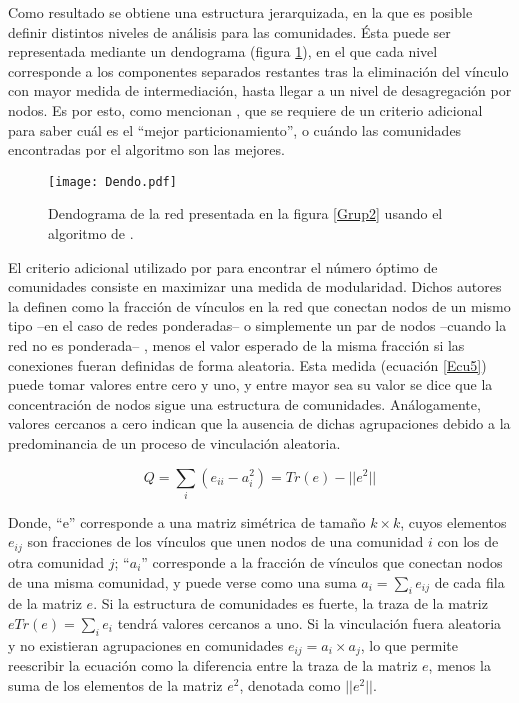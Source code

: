 \documentclass[12pt,letter]{article}
\begin{document}
\vspace{0.5cm}

Como resultado se obtiene una estructura jerarquizada, en la que es posible definir distintos niveles de análisis para las comunidades. Ésta puede ser representada mediante un dendograma (figura \ref{dendo}), en el que cada nivel corresponde a los componentes separados restantes tras la eliminación del vínculo con mayor medida de intermediación, hasta llegar a un nivel de desagregación por nodos. Es por esto, como mencionan \cite{Girvan1, Girvan2}, que se requiere de un criterio adicional para saber cuál es el ``mejor particionamiento'', o cuándo las comunidades encontradas por el algoritmo son las mejores.

\begin{figure}[h!]
\centering
\texttt{[image: Dendo.pdf]}
\caption{\small{Dendograma de la red presentada en la figura \ref{Grup2} usando el algoritmo de \cite{Girvan1, Girvan2}.}} \label{dendo}
\end{figure}

El criterio adicional utilizado por \cite{Girvan1, Girvan2} para encontrar el número óptimo de comunidades consiste en maximizar una medida de modularidad. Dichos autores la definen como la fracción de vínculos en la red que conectan nodos de un mismo tipo --en el caso de redes ponderadas-- o simplemente un par de nodos --cuando la red no es ponderada-- , menos el valor esperado de la misma fracción si las conexiones fueran definidas de forma aleatoria. Esta medida (ecuación \ref{Ecu5}) puede tomar valores entre cero y uno, y entre mayor sea su valor se dice que la concentración de nodos sigue una estructura de comunidades. Análogamente, valores cercanos a cero indican que la ausencia de dichas agrupaciones debido a la predominancia de un proceso de vinculación aleatoria.

\begin{equation}
Q=\sum_i(e_{ii}-a^2_{i})=Tr(e)-||e^2||
\label{Ecu5}
\end{equation}

Donde, ``e'' corresponde a una matriz simétrica de tamaño $k\times k$, cuyos elementos $e_{ij}$ son fracciones de los vínculos que unen nodos de una comunidad $i$ con los de otra comunidad $j$; ``$a_i$'' corresponde a la fracción de vínculos que conectan nodos de una misma comunidad, y puede verse como una suma $a_i =  \sum_ie_{ij}$ de cada fila de la matriz $e$. Si la estructura de comunidades es fuerte, la traza de la matriz $eTr(e) =  \sum_i e_i$ tendrá valores cercanos a uno. Si la vinculación fuera aleatoria y no existieran agrupaciones en comunidades $e_{ij} = a_i \times a_j$, lo que permite reescribir la ecuación como la diferencia entre la traza de la matriz $e$, menos la suma de los elementos de la matriz $e^2$, denotada como $||e^2||$.
\end{document}
